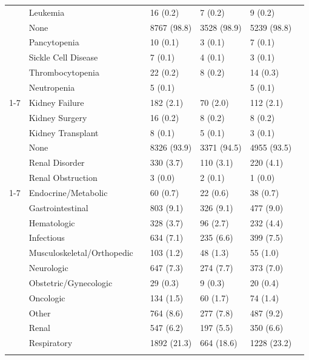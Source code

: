 \begin{tabular}{lllllll}
{{{{{{ & Leukemia &  & 16 (0.2) & 7 (0.2) & 9 (0.2) &  \\
 & None &  & 8767 (98.8) & 3528 (98.9) & 5239 (98.8) &  \\
 & Pancytopenia &  & 10 (0.1) & 3 (0.1) & 7 (0.1) &  \\
 & Sickle Cell Disease &  & 7 (0.1) & 4 (0.1) & 3 (0.1) &  \\
 & Thrombocytopenia &  & 22 (0.2) & 8 (0.2) & 14 (0.3) &  \\
 & Neutropenia &  & 5 (0.1) &  & 5 (0.1) &  \\
\cline{1-7}
\multirow[t]{7}{*}{kidney_type, n (%
 & Kidney Failure &  & 182 (2.1) & 70 (2.0) & 112 (2.1) &  \\
 & Kidney Surgery &  & 16 (0.2) & 8 (0.2) & 8 (0.2) &  \\
 & Kidney Transplant &  & 8 (0.1) & 5 (0.1) & 3 (0.1) &  \\
 & None &  & 8326 (93.9) & 3371 (94.5) & 4955 (93.5) &  \\
 & Renal Disorder &  & 330 (3.7) & 110 (3.1) & 220 (4.1) &  \\
 & Renal Obstruction &  & 3 (0.0) & 2 (0.1) & 1 (0.0) &  \\
\cline{1-7}
\multirow[t]{14}{*}{condition_category, n (%
 & Endocrine/Metabolic &  & 60 (0.7) & 22 (0.6) & 38 (0.7) &  \\
 & Gastrointestinal &  & 803 (9.1) & 326 (9.1) & 477 (9.0) &  \\
 & Hematologic &  & 328 (3.7) & 96 (2.7) & 232 (4.4) &  \\
 & Infectious &  & 634 (7.1) & 235 (6.6) & 399 (7.5) &  \\
 & Musculoskeletal/Orthopedic &  & 103 (1.2) & 48 (1.3) & 55 (1.0) &  \\
 & Neurologic &  & 647 (7.3) & 274 (7.7) & 373 (7.0) &  \\
 & Obstetric/Gynecologic &  & 29 (0.3) & 9 (0.3) & 20 (0.4) &  \\
 & Oncologic &  & 134 (1.5) & 60 (1.7) & 74 (1.4) &  \\
 & Other &  & 764 (8.6) & 277 (7.8) & 487 (9.2) &  \\
 & Renal &  & 547 (6.2) & 197 (5.5) & 350 (6.6) &  \\
 & Respiratory &  & 1892 (21.3) & 664 (18.6) & 1228 (23.2) &  \\
}}}}}}}}
\end{tabular}
